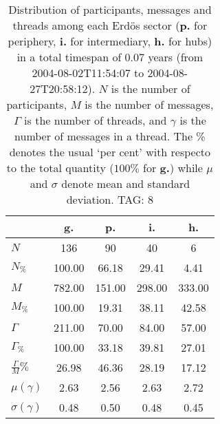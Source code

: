 \begin{table}[h!]
\begin{center}
\begin{tabular}{| l | c | c | c | c |}\hline
 & g. & p. & i. & h. \\\hline
$N$ & 136  & 90  & 40  & 6 \\\hline
$N_{\%}$ & 100.00  & 66.18  & 29.41  & 4.41 \\\hline
$M$ & 782.00  & 151.00  & 298.00  & 333.00 \\\hline
$M_{\%}$ & 100.00  & 19.31  & 38.11  & 42.58 \\\hline
$\Gamma$ & 211.00  & 70.00  & 84.00  & 57.00 \\\hline
$\Gamma_{\%}$ & 100.00  & 33.18  & 39.81  & 27.01 \\\hline
$\frac{\Gamma}{M}\%$ & 26.98  & 46.36  & 28.19  & 17.12 \\\hline
$\mu(\gamma)$ & 2.63  & 2.56  & 2.63  & 2.72 \\\hline
$\sigma(\gamma)$ & 0.48  & 0.50  & 0.48  & 0.45 \\\hline
\end{tabular}
\caption{Distribution of participants, messages and threads among each Erd\"os sector ({\bf p.} for periphery, {\bf i.} for intermediary, 
    {\bf h.} for hubs) in a total timespan of 0.07 years (from 2004-08-02T11:54:07 to 2004-08-27T20:58:12). $N$ is the number of participants, $M$ is the number of messages, $\Gamma$ is the number of threads, and $\gamma$ is the number of messages in a thread.
    The \% denotes the usual `per cent' with respecto to the total quantity ($100\%$ for {\bf g.})
    while $\mu$ and $\sigma$ denote mean and standard deviation. TAG: 8}
\end{center}
\end{table}